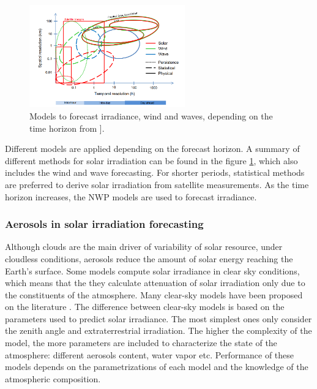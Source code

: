 \begin{itemize}
\begin{figure}[h!]
\centering\includegraphics[width=0.6\textwidth]{figs/widen2.png}
\caption[Irradiance, wind and wave, forecasting methods depending on the time horizon]{Models to forecast irradiance, wind and waves, depending on the time horizon from \cite*{Widen2015}].}
\label{fig:forecast}
\end{figure}


Different models are applied depending on the forecast horizon. A summary of different methods for solar irradiation can be found in the figure \ref{fig:forecast}, which also includes the wind and wave forecasting. For shorter periods, statistical methods are preferred to derive solar irradiation from satellite measurements. As the time horizon increases, the NWP models are used to forecast irradiance.


\end{itemize}

\subsubsection{Aerosols in solar irradiation forecasting}

Although clouds are the main driver of variability of solar resource, under cloudless conditions, aerosols reduce the amount of solar energy reaching the Earth's surface. Some models compute solar irradiance in clear sky conditions, which means that the they calculate attenuation of solar irradiation only due to the constituents of the atmosphere. Many clear-sky models have been proposed on the literature \cite*{Gueymard2012}. The difference between clear-sky models is based on the parameters used to predict solar irradiance. The most simplest ones only consider the zenith angle and extraterrestrial irradiation. The higher the complexity of the model, the more parameters are included to characterize the state of the atmosphere: different aerosols content, water vapor etc. Performance of these models depends on the parametrizations of each model and the knowledge of the atmospheric composition.
 

